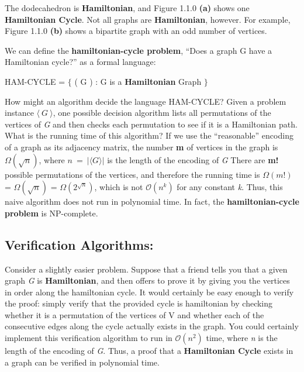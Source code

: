 The dodecahedron is {\bfseries Hamiltonian}, and Figure 1.1.0 {\bfseries (a)} shows one {\bfseries Hamiltonian Cycle}. Not all graphs are {\bfseries Hamiltonian}, however. For example, Figure 1.1.0 {\bfseries (b)} shows a bipartite graph with an odd number of vertices. \hfill \break 

We can define the {\bfseries hamiltonian-cycle problem}, “Does a graph G have a Hamiltonian cycle?” as a formal language: \hfill \break

\begin{center}
HAM-CYCLE = $\lbrace$ ( G ) : G is a {\bfseries Hamiltonian} Graph $\rbrace$
\end{center} \hfill \break

How might an algorithm decide the language HAM-CYCLE? Given a problem instance $\langle\ G\ \rangle$, one possible decision algorithm lists all permutations of the vertices of {\itshape G} and then checks each permutation to see if it is a Hamiltonian path. What is the running time of this algorithm? If we use the “reasonable” encoding of a graph as its adjacency matrix, the number {\bfseries m} of vertices in the graph is $\Omega ( \sqrt{n} )$, where $n\ =\ \vert \langle G \rangle \vert$ is the length of the encoding of {\itshape G} There are {\bfseries m!} possible permutations of the vertices, and therefore the running time is $\Omega ( m! )$ = $\Omega ( \sqrt{n} )$  = $\Omega ( 2^{\sqrt{n}} )$, which is not {\bfseries $\mathcal{O}(n^{k})$} for any constant {\itshape k}. Thus, this naive algorithm does not run in polynomial time. In fact, the {\bfseries hamiltonian-cycle problem} is NP-complete.

\subsection{Verification Algorithms:}

Consider a slightly easier problem. Suppose that a friend tells you that a given graph {\itshape G} is {\bfseries Hamiltonian}, and then offers to prove it by giving you the vertices in order along the hamiltonian cycle. It would certainly be easy enough to verify the proof: simply verify that the provided cycle is hamiltonian by checking whether it is a permutation of the vertices of V and whether each of the consecutive edges along the cycle actually exists in the graph. You could certainly implement this verification algorithm to run in {\bfseries $\mathcal{O}(n^{2})$} time, where {\itshape n} is the length of the encoding of {\itshape G}. Thus, a proof that a {\bfseries Hamiltonian Cycle} exists in a graph can be verified in polynomial time. \hfill \break

